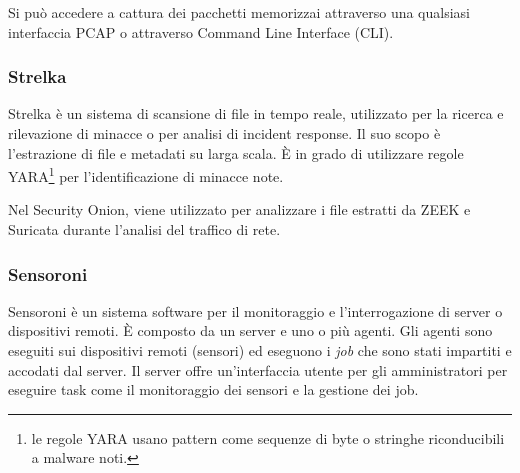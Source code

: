 Si può accedere a cattura dei pacchetti memorizzai attraverso una qualsiasi interfaccia PCAP o attraverso Command Line Interface (CLI).

\subsubsection*{Strelka}
Strelka \cite{strelka} è un sistema di scansione di file in tempo reale, utilizzato per la ricerca e rilevazione di minacce o per analisi di incident response. Il suo scopo è l'estrazione di file e metadati su larga scala. È in grado di utilizzare regole YARA\footnote{le regole YARA usano pattern  come sequenze  di byte  o stringhe riconducibili  a malware noti.} per l'identificazione di minacce note.

Nel Security Onion, viene utilizzato per analizzare i file estratti da ZEEK e Suricata durante l'analisi del traffico di rete.

\subsubsection*{Sensoroni}
Sensoroni \cite{sensoroni} è un sistema software per il monitoraggio e l'interrogazione di server o dispositivi remoti.
È composto da un server e uno o più agenti.
Gli agenti sono  eseguiti sui dispositivi remoti (sensori) ed eseguono i \textit{job} che sono stati impartiti e accodati dal server. 
Il server offre un'interfaccia utente per gli amministratori per eseguire task come il monitoraggio dei sensori e la gestione dei job.

